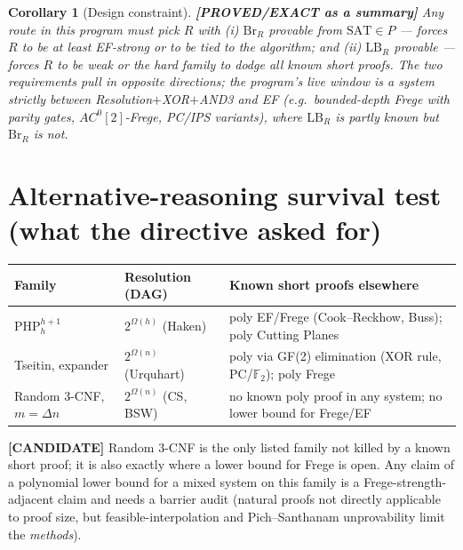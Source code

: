 \documentclass[11pt]{article}
\newtheorem{corollary}[theorem]{Corollary}
\newcommand{\status}[1]{\textbf{[#1]}}
\newcommand{\SAT}{\mathrm{SAT}}
\begin{document}
\begin{corollary}[Design constraint]\status{PROVED/EXACT as a summary}
Any route in this program must pick $R$ with (i) $\mathrm{Br}_R$ provable from $\SAT\in P$ --- forces $R$ to be at least EF-strong or to be tied to the algorithm; and (ii) $\mathrm{LB}_R$ provable --- forces $R$ to be weak or the hard family to dodge all known short proofs. The two requirements pull in opposite directions; the program's live window is a system strictly between Resolution$+$XOR$+$AND3 and EF (e.g.\ bounded-depth Frege with parity gates, $AC^0[2]$-Frege, PC/IPS variants), where $\mathrm{LB}_R$ is partly known but $\mathrm{Br}_R$ is not.
\end{corollary}

\section{Alternative-reasoning survival test (what the directive asked for)}
\begin{center}\small
\begin{tabular}{lll}
Family & Resolution (DAG) & Known short proofs elsewhere \\\hline
PHP$_h^{h+1}$ & $2^{\Omega(h)}$ (Haken) & poly EF/Frege (Cook--Reckhow, Buss); poly Cutting Planes \\
Tseitin, expander & $2^{\Omega(n)}$ (Urquhart) & poly via GF(2) elimination (XOR rule, PC/$\mathbb F_2$); poly Frege \\
Random 3-CNF, $m=\Delta n$ & $2^{\Omega(n)}$ (CS, BSW) & no known poly proof in any system; no lower bound for Frege/EF \\
\end{tabular}
\end{center}
\status{CANDIDATE} Random 3-CNF is the only listed family not killed by a known short proof; it is also exactly where a lower bound for Frege is open. Any claim of a polynomial lower bound for a mixed system on this family is a Frege-strength-adjacent claim and needs a barrier audit (natural proofs not directly applicable to proof size, but feasible-interpolation and Pich--Santhanam unprovability limit the \emph{methods}).
\end{document}

